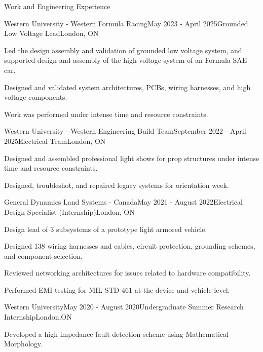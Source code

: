 \documentclass{resume} %
\begin{document}
\begin{rSection}{Work and Engineering Experience}
\begin{rSubsection}{Western University - Western Formula Racing}{May 2023 - April 2025}{Grounded Low Voltage Lead}{London, ON}
\item Led the design assembly and validation of grounded low voltage system, and supported design and assembly of the high voltage system of an Formula SAE car.
\item Designed and validated system architectures, PCBs, wiring harnesses, and high voltage components.
\item Work was performed under intense time and resource constraints.
\end{rSubsection}

\begin{rSubsection}{Western University - Western Engineering Build Team}{September 2022 - April 2025}{Electrical Team}{London, ON}
\item Designed and assembled professional light shows for prop structures under intense time and resource constraints.
\item Designed, troubleshot, and repaired legacy systems for orientation week.
\end{rSubsection}

\begin{rSubsection}{General Dynamics Land Systems - Canada}{May 2021 - August 2022}{Electrical Design Specialist (Internship)}{London, ON}
\item Design lead of 3 subsystems of a prototype light armored vehicle.
\item Designed 138 wiring harnesses and cables, circuit protection, grounding schemes, and component selection.
\item Reviewed networking architectures for issues related to hardware compatibility.
\item Performed EMI testing for MIL-STD-461 at the device and vehicle level.
\end{rSubsection}

\begin{rSubsection}{Western University}{May 2020 - August 2020}{Undergraduate Summer Research Internship}{London,ON}
\item Developed a high impedance fault detection scheme using Mathematical Morphology.
\end{rSubsection}
\end{rSection}
\end{document}
